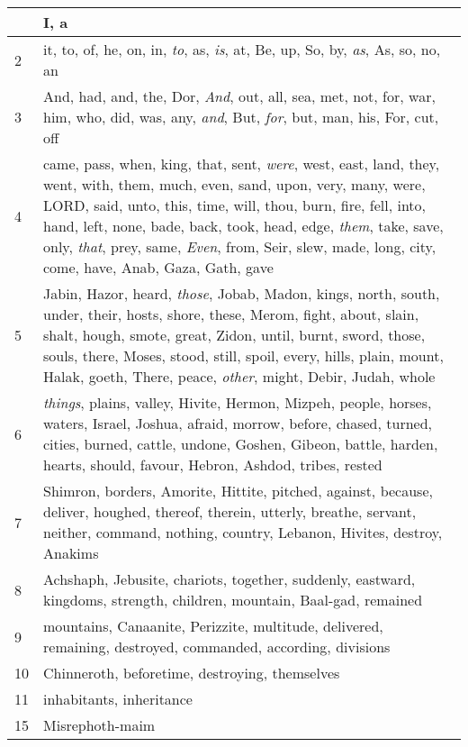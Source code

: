 \begin{longtable}{l|p{3.75in}}
\hline \hline
\endlastfoot
1 & I, a \\ \hline
2 & it, to, of, he, on, in, \emph{to}, as, \emph{is}, at, Be, up, So, by, \emph{as}, As, so, no, an \\ \hline
3 & And, had, and, the, Dor, \emph{And}, out, all, sea, met, not, for, war, him, who, did, was, any, \emph{and}, But, \emph{for}, but, man, his, For, cut, off \\ \hline
4 & came, pass, when, king, that, sent, \emph{were}, west, east, land, they, went, with, them, much, even, sand, upon, very, many, were, LORD, said, unto, this, time, will, thou, burn, fire, fell, into, hand, left, none, bade, back, took, head, edge, \emph{them}, take, save, only, \emph{that}, prey, same, \emph{Even}, from, Seir, slew, made, long, city, come, have, Anab, Gaza, Gath, gave \\ \hline
5 & Jabin, Hazor, heard, \emph{those}, Jobab, Madon, kings, north, south, under, their, hosts, shore, these, Merom, fight, about, slain, shalt, hough, smote, great, Zidon, until, burnt, sword, those, souls, there, Moses, stood, still, spoil, every, hills, plain, mount, Halak, goeth, There, peace, \emph{other}, might, Debir, Judah, whole \\ \hline
6 & \emph{things}, plains, valley, Hivite, Hermon, Mizpeh, people, horses, waters, Israel, Joshua, afraid, morrow, before, chased, turned, cities, burned, cattle, undone, Goshen, Gibeon, battle, harden, hearts, should, favour, Hebron, Ashdod, tribes, rested \\ \hline
7 & Shimron, borders, Amorite, Hittite, pitched, against, because, deliver, houghed, thereof, therein, utterly, breathe, servant, neither, command, nothing, country, Lebanon, Hivites, destroy, Anakims \\ \hline
8 & Achshaph, Jebusite, chariots, together, suddenly, eastward, kingdoms, strength, children, mountain, Baal-gad, remained \\ \hline
9 & mountains, Canaanite, Perizzite, multitude, delivered, remaining, destroyed, commanded, according, divisions \\ \hline
10 & Chinneroth, beforetime, destroying, themselves \\ \hline
11 & inhabitants, inheritance \\ \hline
15 & Misrephoth-maim \\ \hline
\end{longtable}






